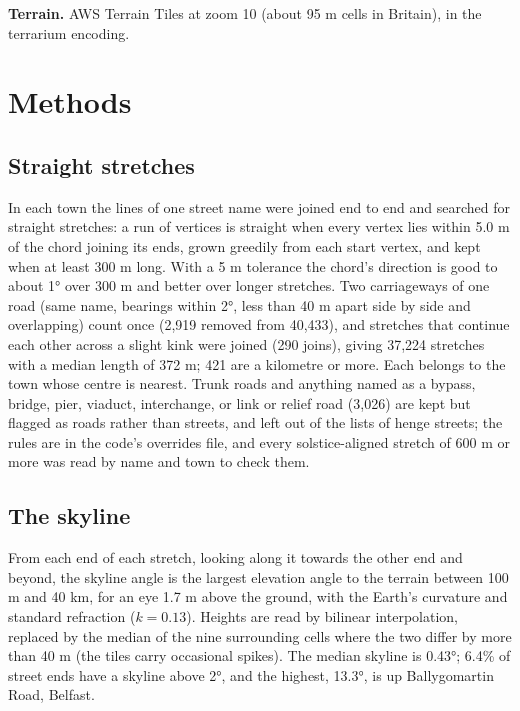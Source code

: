 \documentclass[11pt,a4paper]{article}
\begin{document}
\textbf{Terrain.} AWS Terrain Tiles at zoom 10 (about 95 m cells in Britain), in the terrarium encoding.

\section{Methods}
\subsection{Straight stretches}
In each town the lines of one street name were joined end to end and searched for straight stretches: a run of vertices is straight when every vertex lies within 5.0 m of the chord joining its ends, grown greedily from each start vertex, and kept when at least 300 m long. With a 5 m tolerance the chord's direction is good to about 1° over 300 m and better over longer stretches. Two carriageways of one road (same name, bearings within 2°, less than 40 m apart side by side and overlapping) count once (2,919 removed from 40,433), and stretches that continue each other across a slight kink were joined (290 joins), giving 37,224 stretches with a median length of 372 m; 421 are a kilometre or more. Each belongs to the town whose centre is nearest. Trunk roads and anything named as a bypass, bridge, pier, viaduct, interchange, or link or relief road (3,026) are kept but flagged as roads rather than streets, and left out of the lists of henge streets; the rules are in the code's overrides file, and every solstice-aligned stretch of 600 m or more was read by name and town to check them.

\subsection{The skyline}
From each end of each stretch, looking along it towards the other end and beyond, the skyline angle is the largest elevation angle to the terrain between 100 m and 40 km, for an eye 1.7 m above the ground, with the Earth's curvature and standard refraction ($k = 0.13$). Heights are read by bilinear interpolation, replaced by the median of the nine surrounding cells where the two differ by more than 40 m (the tiles carry occasional spikes). The median skyline is 0.43°; 6.4\% of street ends have a skyline above 2°, and the highest, 13.3°, is up Ballygomartin Road, Belfast.
\end{document}
